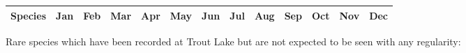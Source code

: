 \documentclass[8pt,letterpaper,notumble,foldmark]{leaflet}
\begin{document}
\selectfont



\newpage

\linespread{0}

{\footnotesize
\tabcolsep=0.005cm

\begin{longtable}{|l|llllllllllllllllllllllllllllllllllllllllllllllll|}
\hline
Species & \multicolumn{4}{c}{Jan} & \multicolumn{4}{c}{Feb} & \multicolumn{4}{c}{Mar} &
\multicolumn{4}{c}{Apr} & \multicolumn{4}{c}{May} & \multicolumn{4}{c}{Jun} &
\multicolumn{4}{c}{Jul} & \multicolumn{4}{c}{Aug} & \multicolumn{4}{c}{Sep} &
\multicolumn{4}{c}{Oct} & \multicolumn{4}{c}{Nov} & \multicolumn{4}{c}{Dec} \\
\hline
\endhead



\hline
\end{longtable}
}
\footnotesize
Rare species which have been recorded at Trout Lake but are not expected to be seen with any regularity: \newline
\par

\end{document}
